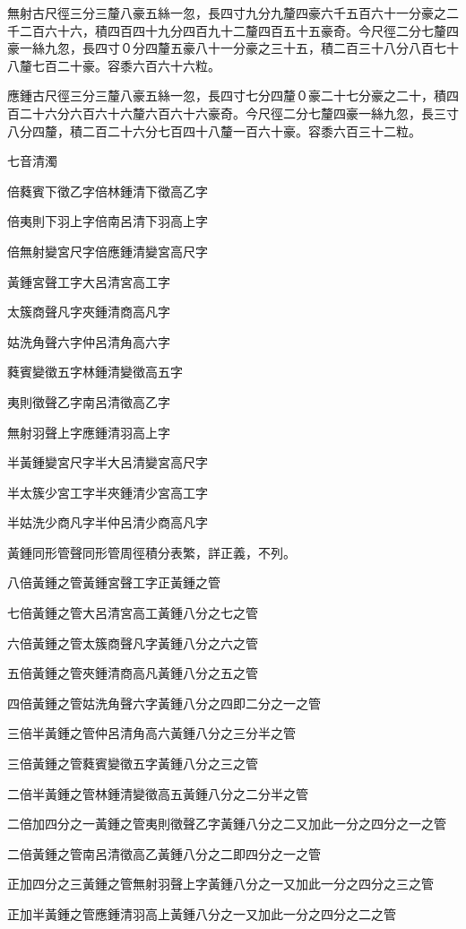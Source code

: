 \begin{pinyinscope}
無射古尺徑三分三釐八豪五絲一忽，長四寸九分九釐四豪六千五百六十一分豪之二千二百六十六，積四百四十九分四百九十二釐四百五十五豪奇。今尺徑二分七釐四豪一絲九忽，長四寸０分四釐五豪八十一分豪之三十五，積二百三十八分八百七十八釐七百二十豪。容黍六百六十六粒。

應鍾古尺徑三分三釐八豪五絲一忽，長四寸七分四釐０豪二十七分豪之二十，積四百二十六分六百六十六釐六百六十六豪奇。今尺徑二分七釐四豪一絲九忽，長三寸八分四釐，積二百二十六分七百四十八釐一百六十豪。容黍六百三十二粒。

七音清濁

倍蕤賓下徵乙字倍林鍾清下徵高乙字

倍夷則下羽上字倍南呂清下羽高上字

倍無射變宮尺字倍應鍾清變宮高尺字

黃鍾宮聲工字大呂清宮高工字

太簇商聲凡字夾鍾清商高凡字

姑洗角聲六字仲呂清角高六字

蕤賓變徵五字林鍾清變徵高五字

夷則徵聲乙字南呂清徵高乙字

無射羽聲上字應鍾清羽高上字

半黃鍾變宮尺字半大呂清變宮高尺字

半太簇少宮工字半夾鍾清少宮高工字

半姑洗少商凡字半仲呂清少商高凡字

黃鍾同形管聲同形管周徑積分表繁，詳正義，不列。

八倍黃鍾之管黃鍾宮聲工字正黃鍾之管

七倍黃鍾之管大呂清宮高工黃鍾八分之七之管

六倍黃鍾之管太簇商聲凡字黃鍾八分之六之管

五倍黃鍾之管夾鍾清商高凡黃鍾八分之五之管

四倍黃鍾之管姑洗角聲六字黃鍾八分之四即二分之一之管

三倍半黃鍾之管仲呂清角高六黃鍾八分之三分半之管

三倍黃鍾之管蕤賓變徵五字黃鍾八分之三之管

二倍半黃鍾之管林鍾清變徵高五黃鍾八分之二分半之管

二倍加四分之一黃鍾之管夷則徵聲乙字黃鍾八分之二又加此一分之四分之一之管

二倍黃鍾之管南呂清徵高乙黃鍾八分之二即四分之一之管

正加四分之三黃鍾之管無射羽聲上字黃鍾八分之一又加此一分之四分之三之管

正加半黃鍾之管應鍾清羽高上黃鍾八分之一又加此一分之四分之二之管


\end{pinyinscope}
